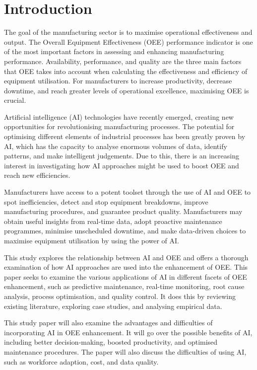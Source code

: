\documentclass[12pt]{article}
\begin{document}
\section{Introduction}
The goal of the manufacturing sector is to maximise operational effectiveness and output. The Overall Equipment Effectiveness (OEE) performance indicator is one of the most important factors in assessing and enhancing manufacturing performance. Availability, performance, and quality are the three main factors that OEE takes into account when calculating the effectiveness and efficiency of equipment utilisation. For manufacturers to increase productivity, decrease downtime, and reach greater levels of operational excellence, maximising OEE is crucial.

Artificial intelligence (AI) technologies have recently emerged, creating new opportunities for revolutionising manufacturing processes. The potential for optimising different elements of industrial processes has been greatly proven by AI, which has the capacity to analyse enormous volumes of data, identify patterns, and make intelligent judgements. Due to this, there is an increasing interest in investigating how AI approaches might be used to boost OEE and reach new efficiencies.

Manufacturers have access to a potent toolset through the use of AI and OEE to spot inefficiencies, detect and stop equipment breakdowns, improve manufacturing procedures, and guarantee product quality. Manufacturers may obtain useful insights from real-time data, adopt proactive maintenance programmes, minimise unscheduled downtime, and make data-driven choices to maximise equipment utilisation by using the power of AI.

This study explores the relationship between AI and OEE and offers a thorough examination of how AI approaches are used into the enhancement of OEE. This paper seeks to examine the various applications of AI in different facets of OEE enhancement, such as predictive maintenance, real-time monitoring, root cause analysis, process optimisation, and quality control. It does this by reviewing existing literature, exploring case studies, and analysing empirical data.

This study paper will also examine the advantages and difficulties of incorporating AI in OEE enhancement. It will go over the possible benefits of AI, including better decision-making, boosted productivity, and optimised maintenance procedures. The paper will also discuss the difficulties of using AI, such as workforce adaption, cost, and data quality.
\end{document}
